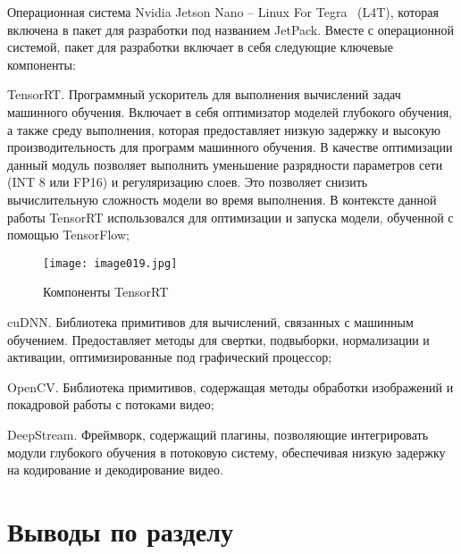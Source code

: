 Операционная система Nvidia Jetson Nano – Linux For Tegra ~(L4T), которая включена в пакет для разработки под названием JetPack. Вместе с операционной системой, пакет для разработки включает в себя следующие ключевые компоненты:

%
\begin{itemize*}
  \item TensorRT.
	Программный ускоритель для выполнения вычислений задач машинного обучения. Включает в себя оптимизатор моделей глубокого обучения, а также среду выполнения, которая предоставляет низкую задержку и высокую производительность для программ машинного обучения.
	В качестве оптимизации данный модуль позволяет выполнить уменьшение разрядности параметров сети (INT 8 или FP16) и регуляризацию слоев. Это позволяет снизить вычислительную сложность модели во время выполнения. 
	В контексте данной работы TensorRT использовался для оптимизации и запуска модели, обученной с помощью TensorFlow;
	\begin{figure}[htbp]
	\centering
	\texttt{[image: image019.jpg]}
	\caption{Компоненты TensorRT}%
	\label{fig:how-to-do-research}
	\end{figure}
  \item cuDNN.
	Библиотека примитивов для вычислений, связанных с машинным обучением. Предоставляет методы для свертки, подвыборки, нормализации и активации, оптимизированные под графический процессор;
  \item OpenCV.
	Библиотека примитивов, содержащая методы обработки изображений и покадровой работы с потоками видео;
  \item DeepStream.
	Фреймворк, содержащий плагины, позволяющие интегрировать модули глубокого обучения в потоковую систему, обеспечивая низкую задержку на кодирование и декодирование видео.
\end{itemize*}
%

\section{Выводы по разделу}


